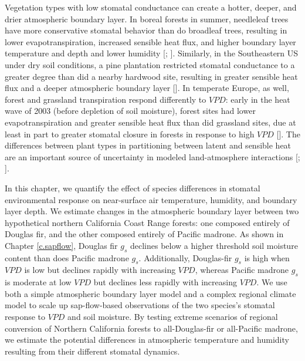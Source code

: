 Vegetation types with low stomatal conductance can create a hotter, deeper, and drier atmospheric boundary layer.  In boreal forests in summer, needleleaf trees have more conservative stomatal behavior than do broadleaf trees, resulting in lower evapotranspiration, increased sensible heat flux, and higher boundary layer temperature and depth and lower humidity [\cite{baldocchi2000climate}; \cite{liu2005changes}].  Similarly, in the Southeastern US under dry soil conditions, a pine plantation restricted stomatal conductance to a greater degree than did a nearby hardwood site, resulting in greater sensible heat flux and a deeper atmospheric boundary layer [\cite{Juang:2007ve}].  In temperate Europe, as well, forest and grassland transpiration respond differently to $VPD$: early in the heat wave of 2003 (before depletion of soil moisture), forest sites had lower evapotranspiration and greater sensible heat flux than did grassland sites, due at least in part to greater stomatal closure in forests in response to high $VPD$ [\cite{teuling2010contrasting}].  The differences between plant types in partitioning between latent and sensible heat are an important source of uncertainty in modeled land-atmosphere interactions [\cite{bonan}; \cite{de2012determining}].

In this chapter, we quantify the effect of species differences in stomatal environmental response on near-surface air temperature, humidity, and boundary layer depth.  We estimate changes in the atmospheric boundary layer between two hypothetical northern California Coast Range forests: one composed entirely of Douglas fir, and the other composed entirely of Pacific madrone.  As shown in Chapter \ref{c.sapflow}, Douglas fir $g_s$ declines below a higher threshold soil moisture content than does Pacific madrone $g_s$.  Additionally, Douglas-fir $g_s$ is high when $VPD$ is low but declines rapidly with increasing $VPD$, whereas Pacific madrone $g_s$ is moderate at low $VPD$ but declines less rapidly with increasing $VPD$.  We use both a simple atmospheric boundary layer model and a complex regional climate model to scale up sap-flow-based observations of the two species's stomatal response to $VPD$ and soil moisture.  By testing extreme scenarios of regional conversion of Northern California forests to all-Douglas-fir or all-Pacific madrone, we estimate the potential differences in atmospheric temperature and humidity resulting from their different stomatal dynamics.
